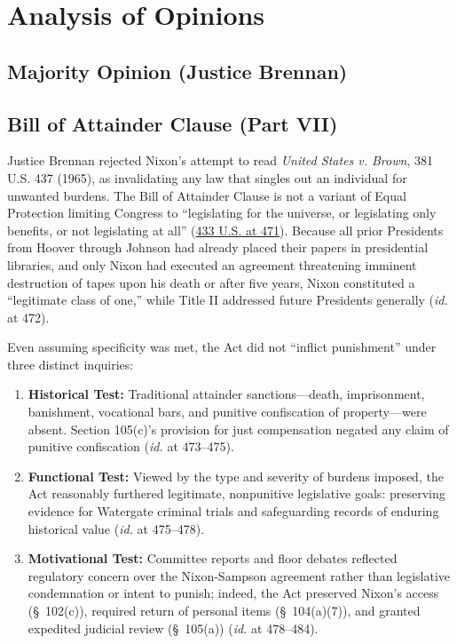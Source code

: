 \documentclass[12pt]{article}
\begin{document}
\section{Analysis of Opinions}
\subsection{Majority Opinion (Justice Brennan)}

\subsection{Bill of Attainder Clause (Part VII)}

Justice Brennan rejected Nixon's attempt to read \textit{United States v. Brown}, 381 U.S. 437 (1965), as invalidating any law that singles out an individual for unwanted burdens. The Bill of Attainder Clause is not a variant of Equal Protection limiting Congress to ``legislating for the universe, or legislating only benefits, or not legislating at all'' (\href{https://supreme.justia.com/cases/federal/us/433/425/}{433 U.S. at 471}). Because all prior Presidents from Hoover through Johnson had already placed their papers in presidential libraries, and only Nixon had executed an agreement threatening imminent destruction of tapes upon his death or after five years, Nixon constituted a ``legitimate class of one,'' while Title II addressed future Presidents generally (\textit{id.} at 472).

Even assuming specificity was met, the Act did not ``inflict punishment'' under three distinct inquiries:
\begin{enumerate}
  \item \textbf{Historical Test:} Traditional attainder sanctions---death, imprisonment, banishment, vocational bars, and punitive confiscation of property---were absent. Section 105(c)'s provision for just compensation negated any claim of punitive confiscation (\textit{id.} at 473--475).
  \item \textbf{Functional Test:} Viewed by the type and severity of burdens imposed, the Act reasonably furthered legitimate, nonpunitive legislative goals: preserving evidence for Watergate criminal trials and safeguarding records of enduring historical value (\textit{id.} at 475--478).
  \item \textbf{Motivational Test:} Committee reports and floor debates reflected regulatory concern over the Nixon-Sampson agreement rather than legislative condemnation or intent to punish; indeed, the Act preserved Nixon's access (\S~102(c)), required return of personal items (\S~104(a)(7)), and granted expedited judicial review (\S~105(a)) (\textit{id.} at 478--484).
\end{enumerate}
\end{document}
